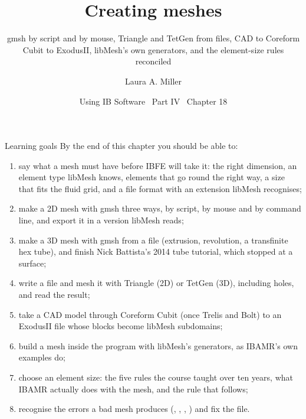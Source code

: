 \documentclass[aspectratio=169,11pt]{beamer}
\title[Creating meshes]{Creating meshes}
\subtitle{gmsh by script and by mouse, Triangle and TetGen from \code{.poly} files, CAD to Coreform Cubit to ExodusII, libMesh's own generators, and the element-size rules reconciled}
\author[Miller]{Laura A. Miller}
\institute[UArizona]{Department of Mathematics, University of Arizona}
\date{Using IB Software \textbullet\ Part IV \textbullet\ Chapter 18}
\begin{document}
\begin{frame}[plain]
\end{frame}

\begin{frame}{Learning goals}
\label{fr:goals}
\footnotesize By the end of this chapter you should be able to:
\begin{enumerate}
  \item say what a mesh must have before IBFE will take it: the right dimension, an element type libMesh knows, elements that go round the right way, a size that fits the fluid grid, and a file format with an extension libMesh recognises;
  \item make a 2D mesh with gmsh three ways, by script, by mouse and by command line, and export it in a version libMesh reads;
  \item make a 3D mesh with gmsh from a  file (extrusion, revolution, a transfinite hex tube), and finish Nick Battista's 2014 tube tutorial, which stopped at a surface;
  \item write a  file and mesh it with Triangle (2D) or TetGen (3D), including holes, and read the result;
  \item take a CAD model through Coreform Cubit (once Trelis and Bolt) to an ExodusII file whose blocks become libMesh subdomains;
  \item build a mesh inside the program with libMesh's generators, as IBAMR's own examples do;
  \item choose an element size: the five rules the course taught over ten years, what IBAMR actually does with the mesh, and the rule that follows;
  \item recognise the errors a bad mesh produces (, , , ) and fix the file.
\end{enumerate}
\end{frame}
\end{document}
